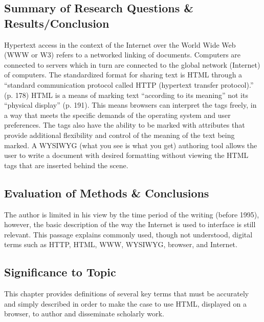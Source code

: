 \documentclass[leavefloats]{apa6e}\usepackage[]{graphicx}\usepackage[]{color}
\begin{document}
\subsection{Summary of Research Questions \& Results/Conclusion} %
Hypertext access in the context of the Internet over the World Wide Web (WWW or W3) refers to a networked linking of documents.  Computers are connected to servers which in turn are connected to the global network (Internet) of computers.  The standardized format for sharing text is HTML through a ``standard communication protocol called HTTP (hypertext transfer protocol).''  (p. 178)  HTML is a means of marking text ``according to its meaning'' not its ``physical display'' (p. 191).  This means browsers can interpret the tags freely, in a way that meets the specific demands of the operating system and user preferences.  The tags also have the ability to be marked with attributes that provide additional flexibility and control of the meaning of the text being marked.  A WYSIWYG (what you see is what you get) authoring tool allows the user to write a document with desired formatting without viewing the HTML tags that are inserted behind the scene.  

\subsection{Evaluation of Methods \& Conclusions} %
The author is limited in his view by the time period of the writing (before 1995), however, the basic description of the way the Internet is used to interface is still relevant.  This passage explains commonly used, though not understood, digital terms such as HTTP, HTML, WWW, WYSIWYG, browser, and Internet.

\subsection{Significance to Topic} %
This chapter provides definitions of several key terms that must be accurately and simply described in order to make the case to use HTML, displayed on a browser, to author and disseminate scholarly work.


 \section{\textcite{Oda2002}}
\end{document}
